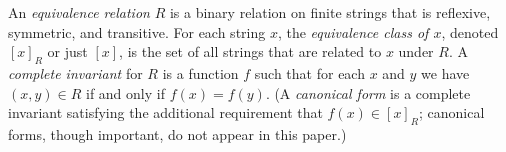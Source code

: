 An \emph{equivalence relation} $R$ is a binary relation on finite strings that is reflexive, symmetric, and transitive.
%
%
For each string $x$, the \emph{equivalence class of $x$}, denoted $[x]_R$ or just $[x]$, is the set of all strings that are related to $x$ under $R$.
%
%
A \emph{complete invariant} for $R$ is a function $f$ such that for each $x$ and $y$ we have $(x, y) \in R$ if and only if $f(x) = f(y)$.
(A \emph{canonical form} is a complete invariant satisfying the additional requirement that $f(x) \in [x]_R$; canonical forms, though important, do not appear in this paper.)



